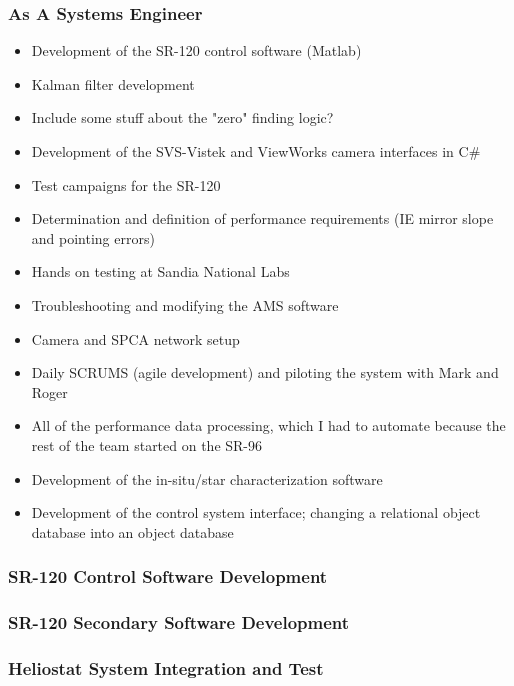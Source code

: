 \documentclass[aspectratio=169]{beamer}
\begin{document}
\begin{frame}
  \frametitle{As A Systems Engineer}
  \begin{itemize}
  \item Development of the SR-120 control software (Matlab)
  \item Kalman filter development
  \item Include some stuff about the "zero" finding logic?
  \item Development of the SVS-Vistek and ViewWorks camera interfaces in C\#
  \item Test campaigns for the SR-120
  \item Determination and definition of performance requirements (IE mirror slope and pointing errors)
  \item Hands on testing at Sandia National Labs
  \item Troubleshooting and modifying the AMS software
  \item Camera and SPCA network setup 
  \item Daily SCRUMS (agile development) and piloting the system with Mark and Roger
  \item All of the performance data processing, which I had to automate because the rest of the team started on the SR-96
  \item Development of the in-situ/star characterization software
  \item Development of the control system interface; changing a relational object database into an object database
  \end{itemize}
\end{frame}

\begin{frame}
  \frametitle{SR-120 Control Software Development}
\end{frame}

\begin{frame}
  \frametitle{SR-120 Secondary Software Development}
\end{frame}

\begin{frame}
  \frametitle{Heliostat System Integration and Test}
\end{frame}
\end{document}
